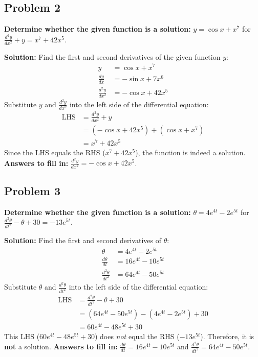 \documentclass[12pt]{article}
\begin{document}
\subsection*{Problem 2}
\textbf{Determine whether the given function is a solution:} $y = \cos x + x^7$ for $\frac{d^2y}{dx^2} + y = x^7 + 42x^5$.

\textbf{Solution:}
Find the first and second derivatives of the given function $y$:
\begin{align*}
    y &= \cos x + x^7 \\
    \frac{dy}{dx} &= -\sin x + 7x^6 \\
    \frac{d^2y}{dx^2} &= -\cos x + 42x^5
\end{align*}
Substitute $y$ and $\frac{d^2y}{dx^2}$ into the left side of the differential equation:
\begin{align*}
    \text{LHS} &= \frac{d^2y}{dx^2} + y \\
    &= (-\cos x + 42x^5) + (\cos x + x^7) \\
    &= x^7 + 42x^5
\end{align*}
Since the LHS equals the RHS ($x^7 + 42x^5$), the function is indeed a solution.
\textbf{Answers to fill in:} $\frac{d^2y}{dx^2} = -\cos x + 42x^5$.

\subsection*{Problem 3}
\textbf{Determine whether the given function is a solution:} $\theta = 4e^{4t} - 2e^{5t}$ for $\frac{d^2\theta}{dt^2} - \theta + 30 = -13e^{5t}$.

\textbf{Solution:}
Find the first and second derivatives of $\theta$:
\begin{align*}
    \theta &= 4e^{4t} - 2e^{5t} \\
    \frac{d\theta}{dt} &= 16e^{4t} - 10e^{5t} \\
    \frac{d^2\theta}{dt^2} &= 64e^{4t} - 50e^{5t}
\end{align*}
Substitute $\theta$ and $\frac{d^2\theta}{dt^2}$ into the left side of the differential equation:
\begin{align*}
    \text{LHS} &= \frac{d^2\theta}{dt^2} - \theta + 30 \\
    &= (64e^{4t} - 50e^{5t}) - (4e^{4t} - 2e^{5t}) + 30 \\
    &= 60e^{4t} - 48e^{5t} + 30
\end{align*}
This LHS ($60e^{4t} - 48e^{5t} + 30$) does \textit{not} equal the RHS ($-13e^{5t}$). Therefore, it is \textbf{not} a solution.
\textbf{Answers to fill in:} $\frac{d\theta}{dt} = 16e^{4t} - 10e^{5t}$ and $\frac{d^2\theta}{dt^2} = 64e^{4t} - 50e^{5t}$.
\end{document}

